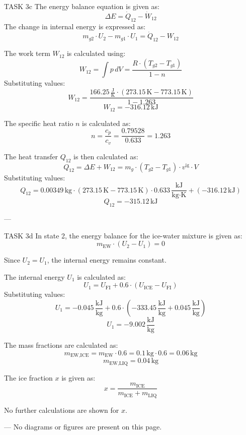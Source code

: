 TASK 3c  
The energy balance equation is given as:  
\[
\Delta E = \dot{Q}_{12} - \dot{W}_{12}
\]  
The change in internal energy is expressed as:  
\[
m_{g2} \cdot U_2 - m_{g1} \cdot U_1 = \dot{Q}_{12} - W_{12}
\]  

The work term \( W_{12} \) is calculated using:  
\[
W_{12} = \int p \, dV = \frac{R \cdot (T_{g2} - T_{g1})}{1 - n}
\]  
Substituting values:  
\[
W_{12} = \frac{166.25 \, \frac{\text{J}}{\text{K}} \cdot (273.15 \, \text{K} - 773.15 \, \text{K})}{1 - 1.263}
\]  
\[
W_{12} = -316.12 \, \text{kJ}
\]  

The specific heat ratio \( n \) is calculated as:  
\[
n = \frac{c_p}{c_v} = \frac{0.79528}{0.633} = 1.263
\]  

The heat transfer \( Q_{12} \) is then calculated as:  
\[
Q_{12} = \Delta E + W_{12} = m_g \cdot (T_{g2} - T_{g1}) \cdot v^{\text{ig}} \cdot V
\]  
Substituting values:  
\[
Q_{12} = 0.00349 \, \text{kg} \cdot (273.15 \, \text{K} - 773.15 \, \text{K}) \cdot 0.633 \, \frac{\text{kJ}}{\text{kg·K}} + (-316.12 \, \text{kJ})
\]  
\[
Q_{12} = -315.12 \, \text{kJ}
\]  

---

TASK 3d  
In state 2, the energy balance for the ice-water mixture is given as:  
\[
m_{\text{EW}} \cdot (U_2 - U_1) = 0
\]  

Since \( U_2 = U_1 \), the internal energy remains constant.  

The internal energy \( U_1 \) is calculated as:  
\[
U_1 = U_{\text{FI}} + 0.6 \cdot (U_{\text{ICE}} - U_{\text{FI}})
\]  
Substituting values:  
\[
U_1 = -0.045 \, \frac{\text{kJ}}{\text{kg}} + 0.6 \cdot (-333.45 \, \frac{\text{kJ}}{\text{kg}} + 0.045 \, \frac{\text{kJ}}{\text{kg}})
\]  
\[
U_1 = -9.002 \, \frac{\text{kJ}}{\text{kg}}
\]  

The mass fractions are calculated as:  
\[
m_{\text{EW,ICE}} = m_{\text{EW}} \cdot 0.6 = 0.1 \, \text{kg} \cdot 0.6 = 0.06 \, \text{kg}
\]  
\[
m_{\text{EW,LIQ}} = 0.04 \, \text{kg}
\]  

The ice fraction \( x \) is given as:  
\[
x = \frac{m_{\text{ICE}}}{m_{\text{ICE}} + m_{\text{LIQ}}}
\]  

No further calculations are shown for \( x \).  

---  
No diagrams or figures are present on this page.